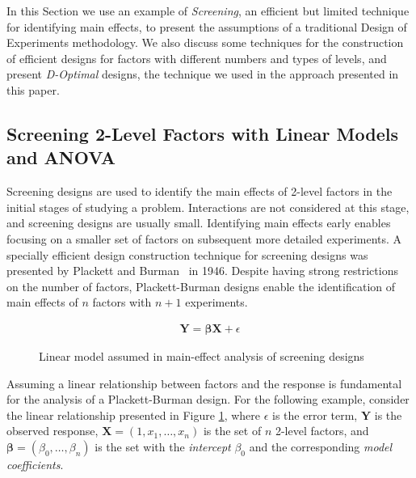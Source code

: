 \documentclass[conference]{IEEEtran}
\begin{document}
In this Section we use an example of \emph{Screening}, an efficient but limited
technique for identifying main effects, to present the assumptions of a
traditional Design of Experiments methodology. We also discuss some techniques
for the construction of efficient designs for factors with different numbers and
types of levels, and present \emph{D-Optimal} designs, the technique we used in the
approach presented in this paper.
\subsection{Screening 2-Level Factors with Linear Models and ANOVA}
\label{sec:org4b40c9a}
Screening designs are used to identify the main effects of 2-level factors in
the initial stages of studying a problem. Interactions are not considered at
this stage, and screening designs are usually small. Identifying main effects
early enables focusing on a smaller set of factors on subsequent more detailed
experiments. A specially efficient design construction technique for screening
designs was presented by Plackett and Burman~\cite{plackett1946design}
in 1946. Despite having strong restrictions on the number of factors,
Plackett-Burman designs enable the identification of main effects of \(n\) factors
with \(n + 1\) experiments.

\begin{figure}
{\normalsize
\begin{align*}
\mathbf{Y} = \bm{\beta}\mathbf{X} + \epsilon
\end{align*}
}
\caption{Linear model assumed in main-effect analysis of screening designs}
\label{fig:linear_assumption}
\end{figure}

Assuming a linear relationship between factors and the response is fundamental
for the analysis of a Plackett-Burman design. For the following example,
consider the linear relationship presented in Figure
\ref{fig:linear_assumption}, where \(\epsilon\) is the error term, \(\mathbf{Y}\) is
the observed response, \(\mathbf{X} = \left(1, x_1,\dots,x_n\right)\) is the set
of \(n\) 2-level factors, and \(\bm{\beta} = \left(\beta_0,\dots,\beta_n\right)\) is
the set with the \emph{intercept} \(\beta_0\) and the corresponding \emph{model
coefficients}.
\end{document}
